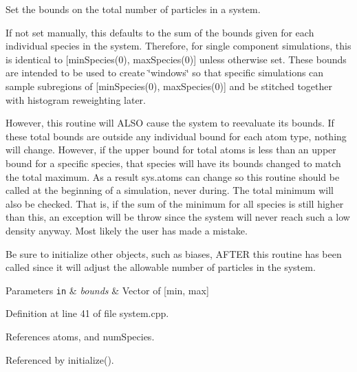 Set the bounds on the total number of particles in a system. 

If not set manually, this defaults to the sum of the bounds given for each individual species in the system. Therefore, for single component simulations, this is identical to \mbox{[}min\-Species(0), max\-Species(0)\mbox{]} unless otherwise set. These bounds are intended to be used to create \char`\"{}windows\char`\"{} so that specific simulations can sample subregions of \mbox{[}min\-Species(0), max\-Species(0)\mbox{]} and be stitched together with histogram reweighting later.

However, this routine will A\-L\-S\-O cause the system to reevaluate its bounds. If these total bounds are outside any individual bound for each atom type, nothing will change. However, if the upper bound for total atoms is less than an upper bound for a specific species, that species will have its bounds changed to match the total maximum. As a result sys.\-atoms can change so this routine should be called at the beginning of a simulation, never during. The total minimum will also be checked. That is, if the sum of the minimum for all species is still higher than this, an exception will be throw since the system will never reach such a low density anyway. Most likely the user has made a mistake.

Be sure to initialize other objects, such as biases, A\-F\-T\-E\-R this routine has been called since it will adjust the allowable number of particles in the system.


\begin{DoxyParams}[1]{Parameters}
\mbox{\tt in}  & {\em bounds} & Vector of \mbox{[}min, max\mbox{]} \\
\hline
\end{DoxyParams}


Definition at line 41 of file system.\-cpp.



References atoms, and num\-Species.



Referenced by initialize().


